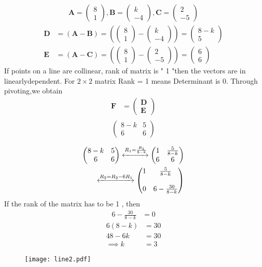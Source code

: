 \documentclass[journal,10pt,twocolumn]{article}
\newcommand{\myvec}[1]{\ensuremath{\begin{pmatrix}#1\end{pmatrix}}}
\let\vec\mathbf
\providecommand{\brak}[1]{\ensuremath{\left(#1\right)}}
\let\vec\mathbf
\begin{document}
\begin{enumerate}
\begin{align}  
\vec{A}=\myvec{8 \\ 1},
\vec{B}=\myvec{k \\ -4},
\vec{C}=\myvec{2 \\ -5}
\end{align}
\begin{align}  
 \vec{D} &=\brak{\vec{A}-\vec{B}} = \brak{\myvec{8 \\1 } - \myvec{k \\-4 } } = \myvec{8-k \\ 5 }\\
\vec{E} &= \brak{\vec{A}-\vec{C}} = \brak{\myvec{8 \\ 1 } - \myvec{2 \\-5 } } = \myvec{6 \\6}
\end{align}
If points on a line  are  collinear, rank of matrix is " 1 "then the vectors are in linearlydependent.
For $2\times2$ matrix Rank = 1 means Determinant is 0.
Through pivoting,we obtain
\begin{align}
\vec{F} &={\myvec{\vec{D}\\ \vec{E}}}
\end{align}
\begin{align}
\begin{split}
\myvec{
8-k & 5
 \\
6 & 6
}
\end{split}
\end{align}
\begin{align}
\label{eq:chem_balance_mat_row}
\myvec{
8-k & 5
\\
6 & 6
}
 \xleftrightarrow[]{R_1=\frac{R_1}{8-k}}
\myvec{
1& \frac{5}{8-k}
\\
6 & 6
}
\\
\xleftrightarrow[]{R_2 = R_2-6R_1}
\myvec{
1 & \frac{5}{8-k}
\\
\\
0 & 6-\frac{30}{8-k}
}
\end{align}
If the rank of the matrix has to be 1 , then
\begin{align}
6-\frac{30}{8-k}&=0
\end{align}
\begin{align}
 6(8-k) &= 30
\\
48-6k &= 30
\\
\implies k &=3
\end{align}
\begin{figure}[H]
	  \centering 
	  \texttt{[image: line2.pdf]}
	  \caption{}
	  \label{fig:line2.png}
	  \end{figure}
\end{enumerate} 
\end{document}
